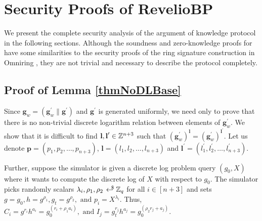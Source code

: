 \appendix
\chapter{Security Proofs of \textnormal{{\selectfont RevelioBP}}}

We present the complete security analysis of the argument of knowledge \proto protocol in the following sections.
Although the soundness and zero-knowledge proofs for \proto have some similarities to the security proofs of the ring signature construction in Omniring \cite{Lai2019}, 
they are not trivial and necessary to describe the \RPlus protocol completely.

\section{Proof of Lemma \ref{thmNoDLBase}}
\label{proofThmNoDLBase}
Since $\textbf{g}_w = (\textbf{g}_w^{\prime} \| \textbf{g}^{\prime})$ and $\textbf{g}^{\prime}$ is generated uniformly, we need only to prove that there is no non-trivial discrete logarithm relation between elements of $\textbf{g}_w^{\prime}$. We show that it is difficult to find $\textbf{l}, \textbf{l}^{\prime} \in \mathbb{Z}^{n+3}$ such that 
$(\textbf{g}_w^{\prime})^{\textbf{l}} = (\textbf{g}_w^{\prime})^{\textbf{l}^{\prime}}$.
Let us denote $\textbf{p} = (p_1, p_2, \dots, p_{n+3})$, $\textbf{l} = (l_1, l_2, \dots, l_{n+3})$ and $\textbf{l}^{\prime} = (l_1^{\prime}, l_2^{\prime}, \dots, l_{n+3}^{\prime})$.

Further, suppose the simulator is given a discrete log problem query $(g_0, X)$ where it wants to compute the discrete log of $X$ with respect to $g_0$. 
The simulator picks randomly scalars $\lambda_i, \rho_1, \rho_2 \rgen \Z_q $ for all $i \in [n+3]$ and sets $g = g_0, h = g^{\rho_1}, g_t = g^{\rho_2}, \text{ and } p_i = X^{\lambda_i}$.
Thus, $C_i = g^{r_i} h^{a_i} = g_0^{(r_i + \rho_1 a_i)}, \text{ and } I_j = g_t^{r_j} h^{a_j} = g_0^{(\rho_2 r_j + a_j)}$.

